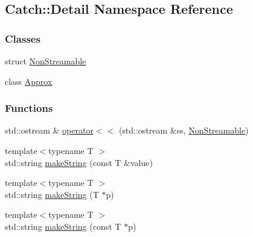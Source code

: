 \hypertarget{namespaceCatch_1_1Detail}{\subsection{Catch\-:\-:Detail Namespace Reference}
\label{namespaceCatch_1_1Detail}
}
\subsubsection*{Classes}
\begin{DoxyCompactItemize}
\item 
struct \hyperlink{structCatch_1_1Detail_1_1NonStreamable}{Non\-Streamable}
\item 
class \hyperlink{classCatch_1_1Detail_1_1Approx}{Approx}
\end{DoxyCompactItemize}
\subsubsection*{Functions}
\begin{DoxyCompactItemize}
\item 
std\-::ostream \& \hyperlink{namespaceCatch_1_1Detail_a604aaf2d9088443c40b2df6d83480760}{operator$<$$<$} (std\-::ostream \&ss, \hyperlink{structCatch_1_1Detail_1_1NonStreamable}{Non\-Streamable})
\item 
{\footnotesize template$<$typename T $>$ }\\std\-::string \hyperlink{namespaceCatch_1_1Detail_ac24273b7859d7c613b7d7435c9b4866f}{make\-String} (const T \&value)
\item 
{\footnotesize template$<$typename T $>$ }\\std\-::string \hyperlink{namespaceCatch_1_1Detail_a7d342c040413beddb689237df522d7bc}{make\-String} (T $\ast$p)
\item 
{\footnotesize template$<$typename T $>$ }\\std\-::string \hyperlink{namespaceCatch_1_1Detail_a68655325519027aa32e30aeb19e0efc0}{make\-String} (const T $\ast$p)
\end{DoxyCompactItemize}


